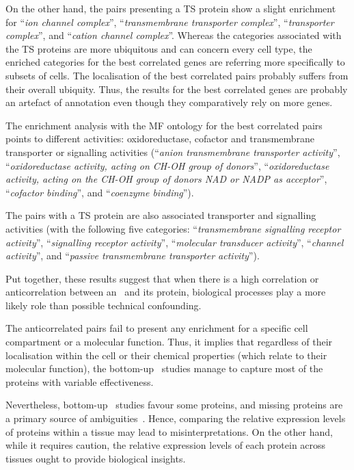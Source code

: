 On the other hand, the pairs presenting a \gls{TS} protein
show a slight enrichment for
\enquote{\textit{ion channel complex}},
\enquote{\textit{transmembrane transporter complex}},
\enquote{\textit{transporter complex}},
and \enquote{\textit{cation channel complex}}.
Whereas the categories associated with the \gls{TS} proteins
are more ubiquitous and can concern every cell type,
the enriched categories for the best correlated genes
are referring more specifically to subsets of cells.
The localisation of the best correlated pairs probably suffers
from their overall ubiquity.
Thus, the results for the best correlated genes are probably an artefact
of annotation
even though they comparatively rely on more genes.\mybr\

The enrichment analysis with the MF ontology
for the best correlated pairs points to different activities:
oxidoreductase, cofactor and transmembrane transporter or signalling activities
(\enquote{\textit{anion transmembrane transporter activity}},
\enquote{\textit{oxidoreductase activity, acting on CH-OH group of donors}},
\enquote{\textit{oxidoreductase activity, acting on the CH-OH group of donors
NAD or NADP as acceptor}},
\enquote{\textit{cofactor binding}},
and \enquote{\textit{coenzyme binding}}).\mybr\

The pairs with a \gls{TS} protein are also associated
transporter and signalling activities
(with the following five categories:
\enquote{\textit{transmembrane signalling receptor activity}},
\enquote{\textit{signalling receptor activity}},
\enquote{\textit{molecular transducer activity}},
\enquote{\textit{channel activity}},
and \enquote{\textit{passive transmembrane transporter activity}}).\mybr\

Put together, these results suggest that
when there is a high correlation or anticorrelation between an \mRNA\ and its protein,
biological processes play a more likely role than possible technical confounding.\mybr\

The anticorrelated pairs fail to present any enrichment
for a specific cell compartment or a molecular function.
Thus, it implies that
regardless of their localisation within the cell
or their chemical properties (which relate to their molecular function),
the bottom-up \ms\ studies manage to capture most of the proteins
with variable effectiveness.\mybr\

Nevertheless, bottom-up \ms\ studies favour some proteins,
and missing proteins are a primary source of ambiguities~.
Hence, comparing the relative expression levels of proteins within a tissue
may lead to misinterpretations.
On the other hand, while it requires caution,
the relative expression levels of each protein across tissues
ought to provide biological insights.\mybr\

